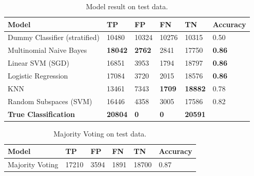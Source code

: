 \begin{table}[]
    \centering
    \caption{Model result on test data.}
    \label{tab:test-table}
    \begin{tabular}{@{}llllll@{}}
    \toprule
    Model                         & TP             & FP            & FN            & TN             & Accuracy      \\ \midrule
    Dummy Classifier (stratified) & 10480          & 10324         & 10276         & 10315          & 0.50          \\
    Multinomial Naive Bayes       & \textbf{18042} & \textbf{2762} & 2841          & 17750          & \textbf{0.86} \\
    Linear SVM (SGD)              & 16851          & 3953          & 1794          & 18797          & \textbf{0.86} \\
    Logistic Regression           & 17084          & 3720          & 2015          & 18576          & \textbf{0.86} \\
    KNN                           & 13461          & 7343          & \textbf{1709} & \textbf{18882} & 0.78          \\
    Random Subspaces (SVM)        & 16446          & 4358          & 3005          & 17586          & 0.82          \\ \midrule
    \textbf{True Classification}  & \textbf{20804} & \textbf{0}    & \textbf{0}    & \textbf{20591} & \textbf{}    
    \end{tabular}
\end{table}



\begin{table}[]
    \centering
    \caption{Majority Voting on test data.}
    \label{tab:voting-table}
    \begin{tabular}{@{}llllll@{}}
    \toprule
    Model                  & TP    & FP   & FN   & TN    & Accuracy \\ \midrule
    Majority Voting     & 17210 & 3594 & 1891 & 18700 & 0.87     \\ \bottomrule
    \end{tabular}
\end{table}



